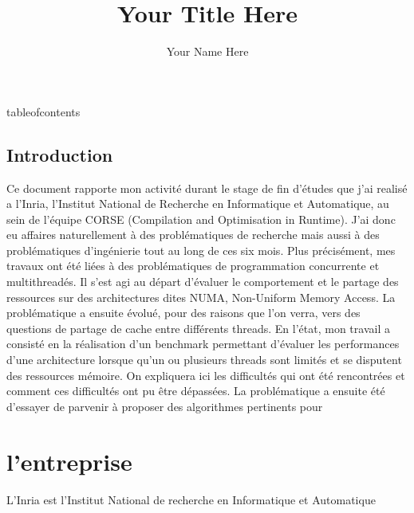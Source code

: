 \documentclass{report}
\author{Your Name Here}
\title{Your Title Here}
\begin{document}
\maketitle
tableofcontents




\section{Introduction}
Ce document rapporte mon activité durant le stage de fin d'études que j'ai 
realisé a l'Inria, l'Institut National de Recherche en Informatique et
Automatique, au sein de l'équipe CORSE (Compilation and Optimisation in Runtime).
J'ai donc eu affaires naturellement à des problématiques de recherche mais aussi à
des problématiques d'ingénierie tout au long de ces six mois. Plus précisément, mes travaux ont été
liées à des problématiques de programmation concurrente et multithreadés. Il s'est agi au départ d'évaluer
le comportement et le partage des ressources sur des architectures dites NUMA, Non-Uniform Memory Access. 
La problématique a ensuite évolué, pour des raisons que l'on verra, vers des questions de partage de cache
entre différents threads.
En l'état, mon travail a consisté en la réalisation d'un benchmark permettant d'évaluer les performances
d'une architecture lorsque qu'un ou plusieurs threads sont limités et se disputent des ressources mémoire.
On expliquera ici les difficultés qui ont été rencontrées et comment ces difficultés ont pu être dépassées.
La problématique a ensuite été d'essayer de parvenir à proposer des algorithmes pertinents pour 

\chapter{l'entreprise}

L'Inria est l'Institut National de recherche en Informatique et Automatique
\end{document}
